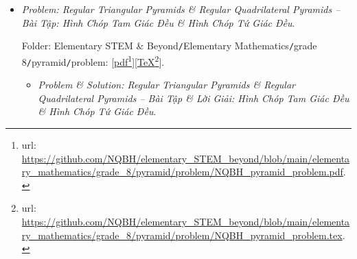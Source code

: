 \documentclass[12pt]{article}
\begin{document}
\begin{itemize}
	Folder: {\sf Elementary STEM \& Beyond{\tt/}Elementary Mathematics{\tt/}grade 8{\tt/}1st-order function{\tt/}problem}: [\href{https://github.com/NQBH/elementary_STEM_beyond/blob/main/elementary_mathematics/grade_8/1st_order_function/problem/NQBH_1st_order_function_problem.pdf}{pdf}\footnote{{\sc url}: \url{https://github.com/NQBH/elementary_STEM_beyond/blob/main/elementary_mathematics/grade_8/1st_order_function/problem/NQBH_1st_order_function_problem.pdf}.}][\href{https://github.com/NQBH/elementary_STEM_beyond/blob/main/elementary_mathematics/grade_8/1st_order_function/problem/NQBH_1st_order_function_problem.tex}{\TeX}\footnote{{\sc url}: \url{https://github.com/NQBH/elementary_STEM_beyond/blob/main/elementary_mathematics/grade_8/1st_order_function/problem/NQBH_1st_order_function_problem.tex}.}].
	\begin{itemize}
		\item {\it Problem \& Solution: 1st-Order Function -- Bài Tập \& Lời Giải: Hàm Số Bậc Nhất $y = ax + b$, $a,b\in\mathbb{R}$, $a\ne0$}.
		
		Folder: {\sf Elementary STEM \& Beyond{\tt/}Elementary Mathematics{\tt/}grade 8{\tt/}1st-order function{\tt/}solution}: [\href{https://github.com/NQBH/elementary_STEM_beyond/blob/main/elementary_mathematics/grade_8/1st_order_function/solution/NQBH_1st_order_function_solution.pdf}{pdf}\footnote{{\sc url}: \url{https://github.com/NQBH/elementary_STEM_beyond/blob/main/elementary_mathematics/grade_8/1st_order_function/solution/NQBH_1st_order_function_solution.pdf}.}][\href{https://github.com/NQBH/elementary_STEM_beyond/blob/main/elementary_mathematics/grade_8/1st_order_function/solution/NQBH_1st_order_function_solution.tex}{\TeX}\footnote{{\sc url}: \url{https://github.com/NQBH/elementary_STEM_beyond/blob/main/elementary_mathematics/grade_8/1st_order_function/solution/NQBH_1st_order_function_solution.tex}.}].
	\end{itemize}
	\item {\it Problem: Regular Triangular Pyramids {\it\&} Regular Quadrilateral Pyramids -- Bài Tập: Hình Chóp Tam Giác Đều {\it\&} Hình Chóp Tứ Giác Đều}.
	
	Folder: {\sf Elementary STEM \& Beyond{\tt/}Elementary Mathematics{\tt/}grade 8{\tt/}pyramid{\tt/}problem}: [\href{https://github.com/NQBH/elementary_STEM_beyond/blob/main/elementary_mathematics/grade_8/pyramid/problem/NQBH_pyramid_problem.pdf}{pdf}\footnote{{\sc url}: \url{https://github.com/NQBH/elementary_STEM_beyond/blob/main/elementary_mathematics/grade_8/pyramid/problem/NQBH_pyramid_problem.pdf}.}][\href{https://github.com/NQBH/elementary_STEM_beyond/blob/main/elementary_mathematics/grade_8/pyramid/problem/NQBH_pyramid_problem.tex}{\TeX}\footnote{{\sc url}: \url{https://github.com/NQBH/elementary_STEM_beyond/blob/main/elementary_mathematics/grade_8/pyramid/problem/NQBH_pyramid_problem.tex}.}].
	\begin{itemize}
		\item {\it Problem \& Solution: Regular Triangular Pyramids \& Regular Quadrilateral Pyramids -- Bài Tập \& Lời Giải: Hình Chóp Tam Giác Đều \& Hình Chóp Tứ Giác Đều}.
		

\end{itemize}
\end{itemize}
\end{document}
